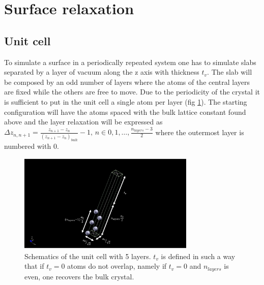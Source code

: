 \documentclass[a4paper, 11pt]{article}
\begin{document}
\section{Surface relaxation}
  \subsection{Unit cell}
    To simulate a surface in a periodically repeated system one has to simulate slabs separated by a layer of vacuum along the z axis with thickness $t_v$. The slab will be composed by an odd number of layers where the atoms of the central layers are fixed while the others are free to move. Due to the periodicity of the crystal it is sufficient to put in the unit cell a single atom per layer (fig \ref{fig:cell}). The starting configuration will have the atoms spaced with the bulk lattice constant found above and the layer relaxation will be expressed as $\Delta z_{n,n+1} = \frac{z_{n+1} - z_n}{\left(z_{n+1} - z_n \right)_{bulk}} -1,\, n \in 0,1,\dots,\frac{n_{layers} - 3}{2}$ where the outermost layer is numbered with 0.

    \begin{figure}
      \centering
      \includegraphics[width=0.75\textwidth]{img/al-nl5-cell.pdf}
      \caption{Schematics of the unit cell with 5 layers. $t_v$ is defined in such a way that if $t_v = 0$ atoms do not overlap, namely if $t_v = 0$ and $n_{layers}$ is even, one recovers the bulk crystal.}
      \label{fig:cell}
    \end{figure}
\end{document}
